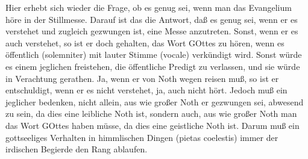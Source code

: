 Hier erhebt sich wieder die Frage, ob es genug sei, wenn man das Evangelium höre in der Stillmesse. Darauf ist das die Antwort, daß es genug sei, wenn er es verstehet und zugleich gezwungen ist, eine Messe anzutreten. Sonst, wenn er es auch verstehet, so ist er doch gehalten, das Wort GOttes zu hören, wenn es öffentlich (solemniter) mit lauter Stimme (vocale) verkündigt wird. Sonst würde es einem jeglichen freistehen, die öffentliche Predigt zu verlassen, und sie würde in Verachtung gerathen. Ja, wenn er von Noth wegen reisen muß, so ist er entschuldigt, wenn er es nicht verstehet, ja, auch nicht hört. Jedoch muß ein jeglicher bedenken, nicht allein, aus wie großer Noth er gezwungen sei, abwesend zu sein, da dies eine leibliche Noth ist, sondern auch, aus wie großer Noth man das Wort GOttes haben müsse, da dies eine geistliche Noth ist. Darum muß ein gottseeliges Verhalten in himmlischen Dingen (pietas coelestis) immer der irdischen Begierde den Rang ablaufen.


